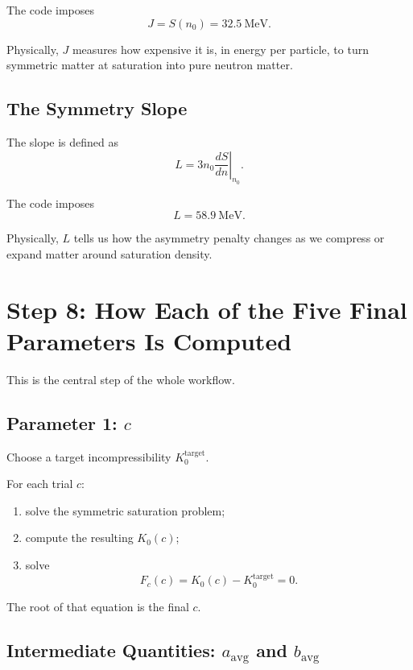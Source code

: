 \documentclass[11pt]{article}
\begin{document}
The code imposes
\begin{equation}
J=S(n_0)=32.5\ \mathrm{MeV}.
\end{equation}

Physically, $J$ measures how expensive it is, in energy per particle, to turn
symmetric matter at saturation into pure neutron matter.

\subsection{The Symmetry Slope}

The slope is defined as
\begin{equation}
L
=
3n_0\left.\frac{dS}{dn}\right|_{n_0}.
\end{equation}

The code imposes
\begin{equation}
L=58.9\ \mathrm{MeV}.
\end{equation}

Physically, $L$ tells us how the asymmetry penalty changes as we compress or
expand matter around saturation density.

\section{Step 8: How Each of the Five Final Parameters Is Computed}

This is the central step of the whole workflow.

\subsection{Parameter 1: \texorpdfstring{$c$}{c}}

Choose a target incompressibility $K_0^{\mathrm{target}}$.

For each trial $c$:
\begin{enumerate}
\item solve the symmetric saturation problem;
\item compute the resulting $K_0(c)$;
\item solve
\[
F_c(c)=K_0(c)-K_0^{\mathrm{target}}=0.
\]
\end{enumerate}

The root of that equation is the final $c$.

\subsection{Intermediate Quantities: \texorpdfstring{$a_{\mathrm{avg}}$}{aavg} and \texorpdfstring{$b_{\mathrm{avg}}$}{bavg}}
\end{document}
